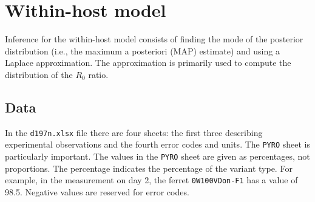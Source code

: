 \documentclass{article}
\begin{document}
\section{Within-host model}
Inference for the within-host model consists of finding the mode of the posterior distribution (i.e., the maximum a posteriori (MAP) estimate) and using a Laplace approximation.
The approximation is primarily used to compute the distribution of the $R_0$ ratio.
\subsection{Data}
In the \verb=d197n.xlsx= file there are four sheets: the first three describing experimental observations and the fourth error codes and units.
The \verb=PYRO= sheet is particularly important.
The values in the \verb=PYRO= sheet are given as percentages, not proportions.
The percentage indicates the percentage of the variant type.
For example, in the measurement on day 2, the ferret \verb=0W100VDon-F1= has a value of 98.5.
Negative values are reserved for error codes.
\end{document}
